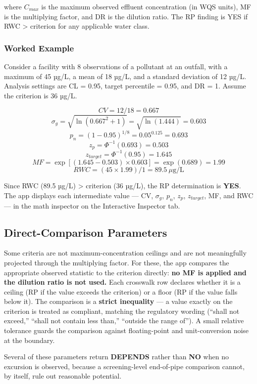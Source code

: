 \documentclass[
  11pt,
  letterpaper,
  DIV=11,
  numbers=noendperiod]{scrartcl}
\begin{document}
where \(C_{max}\) is the maximum observed effluent concentration (in WQS
units), MF is the multiplying factor, and DR is the dilution ratio. The
RP finding is YES if RWC \textgreater{} criterion for any applicable
water class.

\subsubsection{Worked Example}\label{sec-mf-example}

Consider a facility with 8 observations of a pollutant at an outfall,
with a maximum of 45 µg/L, a mean of 18 µg/L, and a standard deviation
of 12 µg/L. Analysis settings are CL = 0.95, target percentile = 0.95,
and DR = 1. Assume the criterion is 36 µg/L.

\[CV = 12 / 18 = 0.667\]
\[\sigma_g = \sqrt{\ln(0.667^2 + 1)} = \sqrt{\ln(1.444)} = 0.603\]
\[p_n = (1 - 0.95)^{1/8} = 0.05^{0.125} = 0.693\]
\[z_p = \Phi^{-1}(0.693) = 0.503\]
\[z_{target} = \Phi^{-1}(0.95) = 1.645\]
\[MF = \exp\left[(1.645 - 0.503) \times 0.603\right] = \exp(0.689) = 1.99\]
\[RWC = (45 \times 1.99) / 1 = 89.5 \ \mu\text{g/L}\]

Since RWC (89.5 µg/L) \textgreater{} criterion (36 µg/L), the RP
determination is \textbf{YES}. The app displays each intermediate value
--- CV, \(\sigma_g\), \(p_n\), \(z_p\), \(z_{target}\), MF, and RWC ---
in the math inspector on the Interactive Inspector tab.

\subsection{Direct-Comparison Parameters}\label{sec-direct}

Some criteria are not maximum-concentration ceilings and are not
meaningfully projected through the multiplying factor. For these, the
app compares the appropriate observed statistic to the criterion
directly: \textbf{no MF is applied and the dilution ratio is not used.}
Each crosswalk row declares whether it is a ceiling (RP if the value
exceeds the criterion) or a floor (RP if the value falls below it). The
comparison is a \textbf{strict inequality} --- a value exactly on the
criterion is treated as compliant, matching the regulatory wording
(``shall not exceed,'' ``shall not contain less than,'' ``outside the
range of''). A small relative tolerance guards the comparison against
floating-point and unit-conversion noise at the boundary.

Several of these parameters return \textbf{DEPENDS} rather than
\textbf{NO} when no excursion is observed, because a screening-level
end-of-pipe comparison cannot, by itself, rule out reasonable potential.
\end{document}
